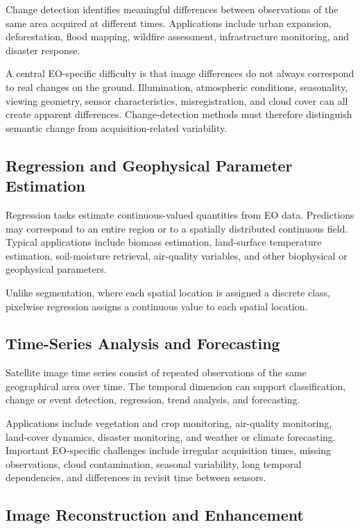 \documentclass[
    11pt,
    a4paper,
    parskip=half,
    bibliography=totoc,
    numbers=noenddot
]{scrartcl}
\begin{document}
Change detection identifies meaningful differences between observations
of the same area acquired at different times. Applications include urban
expansion, deforestation, flood mapping, wildfire assessment,
infrastructure monitoring, and disaster response.

A central EO-specific difficulty is that image differences do not always
correspond to real changes on the ground. Illumination, atmospheric
conditions, seasonality, viewing geometry, sensor characteristics,
misregistration, and cloud cover can all create apparent differences.
Change-detection methods must therefore distinguish semantic change from
acquisition-related variability.

\subsection{Regression and Geophysical Parameter Estimation}

Regression tasks estimate continuous-valued quantities from EO data.
Predictions may correspond to an entire region or to a spatially
distributed continuous field. Typical applications include biomass
estimation, land-surface temperature estimation, soil-moisture retrieval,
air-quality variables, and other biophysical or geophysical parameters.

Unlike segmentation, where each spatial location is assigned a discrete
class, pixelwise regression assigns a continuous value to each spatial
location.

\subsection{Time-Series Analysis and Forecasting}

Satellite image time series consist of repeated observations of the same
geographical area over time. The temporal dimension can support
classification, change or event detection, regression, trend analysis,
and forecasting.

Applications include vegetation and crop monitoring, air-quality
monitoring, land-cover dynamics, disaster monitoring, and weather or
climate forecasting. Important EO-specific challenges include irregular
acquisition times, missing observations, cloud contamination, seasonal
variability, long temporal dependencies, and differences in revisit time
between sensors.

\subsection{Image Reconstruction and Enhancement}
\end{document}
